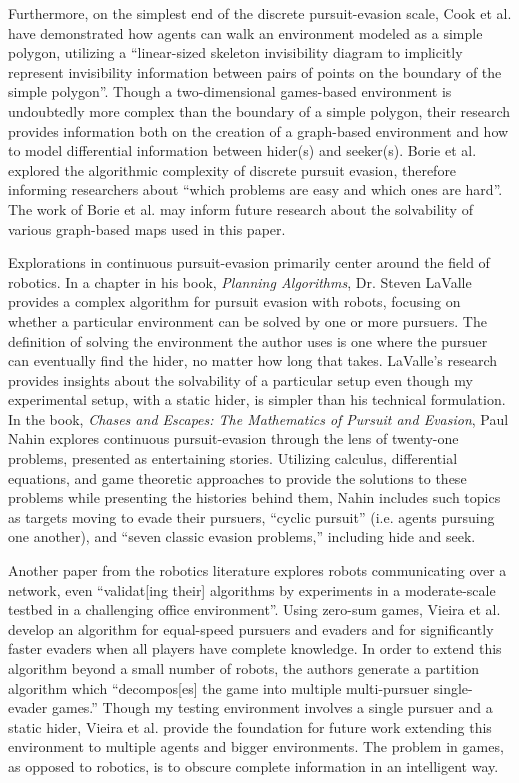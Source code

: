 \documentclass[12pt]{article}
\begin{document}
Furthermore, on the simplest end of the discrete pursuit-evasion scale, Cook et al. have demonstrated how agents can walk an environment modeled as a simple polygon, utilizing a ``linear-sized skeleton invisibility diagram to implicitly represent invisibility information between pairs of points on the boundary of the simple polygon''\cite{Cook}. Though a two-dimensional games-based environment is undoubtedly more complex than the boundary of a simple polygon, their research provides information both on the creation of a graph-based environment and how to model differential information between hider(s) and seeker(s). Borie et al. explored the algorithmic complexity of discrete pursuit evasion, therefore informing researchers about ``which problems are easy and which ones are hard''\cite{Borie}. The work of Borie et al. may inform future research about the solvability of various graph-based maps used in this paper.

Explorations in continuous pursuit-evasion primarily center around the field of robotics. In a chapter in his book, \textit{Planning Algorithms}, Dr. Steven LaValle provides a complex algorithm for pursuit evasion with robots, focusing on whether a particular environment can be solved by one or more pursuers\cite{LaValle}. The definition of solving the environment the author uses is one where the pursuer can eventually find the hider, no matter how long that takes. LaValle's research provides insights about the solvability of a particular setup even though my experimental setup, with a static hider, is simpler than his technical formulation. In the book, \textit{Chases and Escapes: The Mathematics of Pursuit and Evasion}, Paul Nahin explores continuous pursuit-evasion through the lens of twenty-one problems, presented as entertaining stories\cite{Nahin}. Utilizing calculus, differential equations, and game theoretic approaches to provide the solutions to these problems while presenting the histories behind them, Nahin includes such topics as targets moving to evade their pursuers, ``cyclic pursuit'' (i.e. agents pursuing one another), and ``seven classic evasion problems,'' including hide and seek.

Another paper from the robotics literature explores robots communicating over a network, even ``validat[ing their] algorithms by experiments in a moderate-scale testbed in a challenging office environment''\cite{Vieira}. Using zero-sum games, Vieira et al. develop an algorithm for equal-speed pursuers and evaders and for significantly faster evaders when all players have complete knowledge. In order to extend this algorithm beyond a small number of robots, the authors generate a partition algorithm which ``decompos[es] the game into multiple multi-pursuer single-evader games.'' Though my testing environment involves a single pursuer and a static hider, Vieira et al. provide the foundation for future work extending this environment to multiple agents and bigger environments. The problem in games, as opposed to robotics, is to obscure complete information in an intelligent way. 
\end{document}

